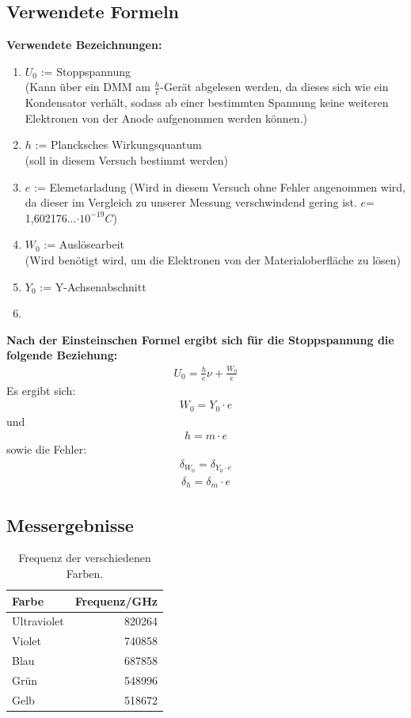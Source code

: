 \documentclass[12px]{scrartcl}
\begin{document}
\subsection{Verwendete Formeln}
\textbf{Verwendete Bezeichnungen:}
\begin{enumerate}
\item $U_0$ := Stoppspannung\\ (Kann über ein DMM am $\frac{h}{e}$-Gerät abgelesen werden, da dieses sich wie ein Kondensator verhält, sodass ab einer bestimmten Spannung keine weiteren Elektronen von der Anode aufgenommen werden können.)
\item $h$ := Plancksches Wirkungsquantum\\
(soll in diesem Versuch bestimmt werden)
\item $e$ := Elemetarladung
(Wird in diesem Versuch ohne Fehler angenommen wird, da dieser im Vergleich zu unserer Messung verschwindend gering ist. $e$= 1,602176...$\cdot10^{-19}C$)
\item $W_0$ := Auslösearbeit\\
(Wird benötigt wird, um die Elektronen von der Materialoberfläche zu lösen)
\item $Y_0$ := Y-Achsenabschnitt
\item

\end{enumerate}
\textbf{Nach der Einsteinschen Formel ergibt sich für die Stoppspannung die folgende Beziehung:}
\begin{align}
U_0 = \frac{h}{e}\nu + \frac{W_0}{e}
\label{enq:stop}
\end{align}
Es ergibt sich:
\begin{align}
W_0 = Y_0\cdot e
\end{align}
und
\begin{align}
h = m\cdot e
\end{align}
sowie die Fehler:
\begin{align}
\delta_{W_0} = \delta_{Y_0\cdot e}
\end{align}
\begin{align}
\delta_h = \delta_m\cdot e
\end{align}
\subsection{Messergebnisse}
\begin{table}[H]
\caption{Frequenz der verschiedenen Farben.}
\begin{center}
\begin{tabular}{|l|r|}
\hline
Farbe & \multicolumn{1}{l|}{Frequenz/GHz} \\ \hline
Ultraviolet & 820264 \\ \hline
Violet  & 740858 \\ \hline
Blau & 687858 \\ \hline
Grün & 548996 \\ \hline
Gelb & 518672 \\ \hline
\end{tabular}
\end{center}
\label{tab:frequenz}
\end{table}
\end{document}
